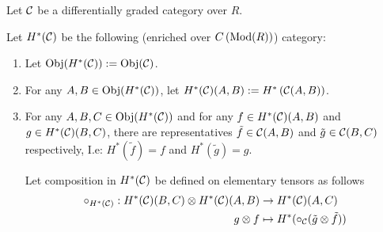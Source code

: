 \begin{definition}
    Let \( {\mathcal{C}} \) be a differentially graded category over  \( R \).

    Let \( H^*({\mathcal{C}}) \) be the following (enriched over \( C\left( \operatorname{Mod}(R) \right) \)) category:
    \begin{enumerate}
        \item Let \( \operatorname{Obj}(H^*({\mathcal{C}})) := \operatorname{Obj}({\mathcal{C}}) \).
        \item For any \( A, B \in \operatorname{Obj}(H^*({\mathcal{C}})) \), let \( H^*({\mathcal{C}})(A, B) := H^* \left( {\mathcal{C}}(A, B) \right) \).
        \item {
            For any \( A, B, C \in \operatorname{Obj}(H^*({\mathcal{C}})) \) and for any \( f \in H^*({\mathcal{C}})(A, B) \) and \( g \in H^*({\mathcal{C}})(B, C) \), there are representatives \( \tilde{f} \in {\mathcal{C}}(A, B) \) and \( \tilde{g} \in {\mathcal{C}}(B, C) \) respectively, I.e: \( H^*(\tilde{f}) = f \) and \( H^*(\tilde{g}) = g \).

            Let composition in \( H^*({\mathcal{C}}) \) be defined on elementary tensors as follows
            \begin{align*}
                \circ_{H^*({\mathcal{C}})}: H^*({\mathcal{C}})(B, C) \otimes H^*({\mathcal{C}})(A, B) &\to H^*({\mathcal{C}})(A, C) \\
                g \otimes f &\mapsto H^*(\circ_{{\mathcal{C}}}(\tilde{g} \otimes \tilde{f}))
            \end{align*}
        }
    \end{enumerate}
\end{definition}

